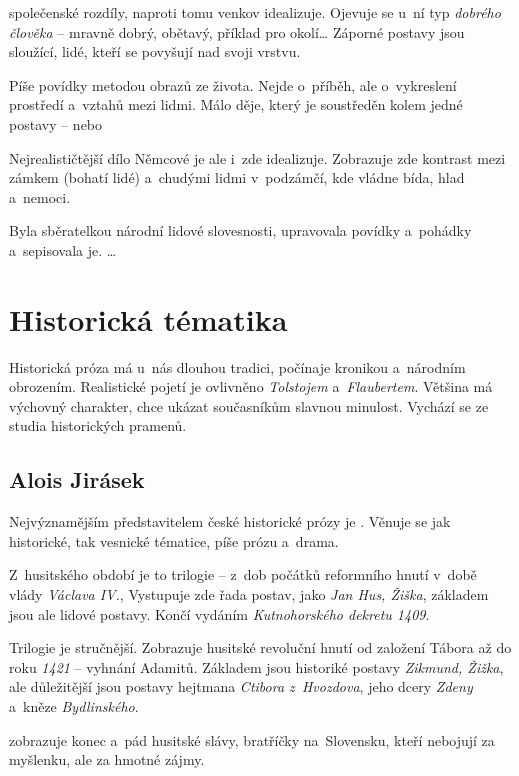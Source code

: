 společenské rozdíly, naproti tomu venkov idealizuje. Ojevuje se u~ní typ 
\emph{dobrého člověka} -- mravně dobrý, obětavý, příklad pro okolí\dots{}
Záporné postavy jsou sloužící, lidé, kteří se povyšují nad svoji vrstvu.

Píše povídky metodou obrazů ze života. Nejde o~příběh, ale o~vykreslení
prostředí a~vztahů mezi lidmi. Málo děje, který je soustředěn kolem
jedné postavy --   
nebo  

Nejrealističtější dílo Němcové je  ale i~zde
idealizuje. Zobrazuje zde kontrast mezi zámkem (bohatí lidé) a~chudými
lidmi v~podzámčí, kde vládne bída, hlad a~nemoci.

Byla sběratelkou národní lidové slovesnosti, upravovala povídky
a~pohádky  a~sepisovala je.  
 
 \dots{}

\section{Historická tématika}
Historická próza má u~nás dlouhou tradici, počínaje kronikou a~národním
obrozením. Realistické pojetí je ovlivněno \emph{Tolstojem} a~\emph{Flaubertem}.
Většina má výchovný charakter, chce ukázat současníkům slavnou minulost.
Vychází se ze studia historických pramenů.

\subsection*{Alois Jirásek}
Nejvýznamějším představitelem české historické prózy je .
Věnuje se jak historické, tak vesnické tématice, píše prózu a~drama.

Z~husitského období je to trilogie  -- z~dob počátků
reformního hnutí v~době vlády \emph{Václava IV.}, Vystupuje zde řada
postav, jako \emph{Jan Hus, Žiška}, základem jsou ale lidové postavy.
Končí vydáním \emph{Kutnohorského dekretu 1409}.

Trilogie  je stručnější. Zobrazuje husitské revoluční
hnutí od založení Tábora až do roku \emph{1421} -- vyhnání Adamitů.
Základem jsou historiké postavy \emph{Zikmund, Žižka}, ale důležitější
jsou postavy hejtmana \emph{Ctibora z~Hvozdova}, jeho dcery \emph{Zdeny}
a~kněze \emph{Bydlinského}.

 zobrazuje konec a~pád husitské slávy, bratříčky
na~Slovensku, kteří nebojují za myšlenku, ale za hmotné zájmy.


